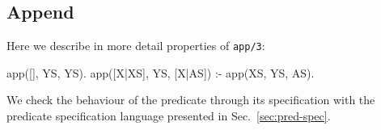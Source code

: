 \documentclass[runningheads,a4paper]{../../PaperStyles/llncs}
\newcommand{\yap}[1]{\lstinline[style=yap]{#1}}
\newcommand{\todo}[2][?]{\marginpar{\raggedright \tiny TODO: #2}}
\newcommand{\refSec}[1]{Sec.~\ref{#1}}
\newcommand{\Prolog}[0]{{\sf Prolog}}
\begin{document}






\subsection{Append}
Here we describe in more detail properties of  \yap{app/3}:
%
\begin{yapcode}
 app([], YS, YS).
 app([X|XS], YS, [X|AS]) :- app(XS, YS, AS).
\end{yapcode}
%
We check the behaviour of the predicate through its specification with
the predicate specification language presented in
\refSec{sec:pred-spec}.
%
\end{document}

